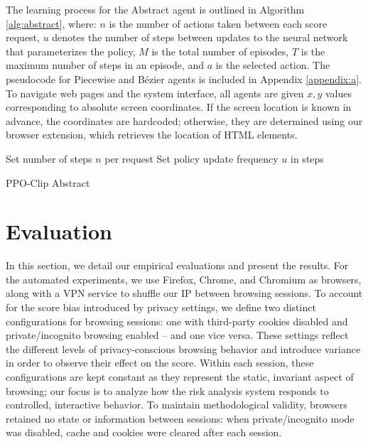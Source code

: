The learning process for the Abstract agent is outlined in Algorithm \ref{alg:abstract}, where: $n$ is the number of actions taken between each score request, $u$ denotes the number of steps between updates to the neural network that parameterizes the policy, $M$ is the total number of episodes, $T$ is the maximum number of steps in an episode, and $a$ is the selected action.
The pseudocode for Piecewise and Bézier agents is included in Appendix \ref{appendix:a}.
To navigate web pages and the system interface, all agents are given $x,y$ values corresponding to absolute screen coordinates.
If the screen location is known in advance, the coordinates are hardcoded; otherwise, they are determined using our browser extension, which retrieves the location of HTML elements.

\begin{algorithm}
\SetAlgoLined
 Set number of steps $n$ per request\;
 Set policy update frequency $u$ in steps\;
 \caption{PPO-Clip Abstract}
 \label{alg:abstract}
\end{algorithm}

\section{Evaluation}
\label{sec:evaluationrere}

In this section, we detail our empirical evaluations and present the results.
For the automated experiments, we use Firefox, Chrome, and Chromium as browsers, along with a VPN service to shuffle our IP between browsing sessions.
To account for the score bias introduced by privacy settings, we define two distinct configurations for browsing sessions: one with third-party cookies disabled and private/incognito browsing enabled -- and one vice versa.
These settings reflect the different levels of privacy-conscious browsing behavior and introduce variance in order to observe their effect on the score.
Within each session, these configurations are kept constant as they represent the static, invariant aspect of browsing; our focus is to analyze how the risk analysis system responds to controlled, interactive behavior.
To maintain methodological validity, browsers retained no state or information between sessions: when private/incognito mode was disabled, cache and cookies were cleared after each session.


